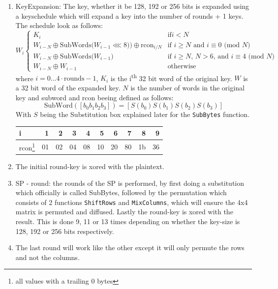 \documentclass[a4paper]{article}
\begin{document}
\begin{enumerate}
\item KeyExpansion: The key, whether it be 128, 192 or 256 bits is expanded using a keyschedule which will expand a key into the number of rounds + 1 keys. The schedule look as follows:
\begin{equation}
W_i \begin{cases}
    K_i & \text{if} i < N\\
    W_{i-N} \oplus \text{SubWords($W_{i-1}\lll 8$))} \oplus \text{rcon}_{i/N} & \text{if $i \geq N$ and $i \equiv 0$ (mod $N$)}\\
    W_{i-N} \oplus \text{SubWords($W_{i-1}$)} & \text{if $i \geq N$, $N > 6$, and $i \equiv 4$ (mod $N$)}\\
    W_{i-N} \oplus W_{i-1} & \text{otherwise}
\end{cases}
\end{equation}
where \(i = 0 ... 4 \cdot \text{rounds} - 1\), \(K_i\) is the i\textsuperscript{th} 32 bit word of the original key. \(W\) is a 32 bit word of the expanded key. \(N\) is the number of words in the original key and subword and rcon beeing defined as follows:
\begin{equation}
 \text{SubWord}([b_0 b_1 b_2 b_3]) = [S(b_0) S(b_1) S(b_2) S(b_3)] \text{}
\end{equation}
With \(S\) being the Substitution box explained later for the \texttt{SubBytes} function.
\begin{center}
\begin{tabular}{lrrrrrrrrr}
i & 1 & 2 & 3 & 4 & 5 & 6 & 7 & 8 & 9\\
\hline
rcon\footnote{all values with a trailing 0 bytes} & 01 & 02 & 04 & 08 & 10 & 20 & 80 & 1b & 36\\
\end{tabular}

\end{center}

\item The initial round-key is xored with the plaintext.
\item SP - round: the rounds of the SP is performed, by first doing a substitution which officially is called SubBytes\cite{Rijndahl}, followed by the permutation which consists of 2 functions \texttt{ShiftRows} and \texttt{MixColumns}, which will ensure the 4x4 matrix is permuted and diffused. Lastly the round-key is xored with the result. This is done 9, 11 or 13 times depending on whether the key-size is 128, 192 or 256 bits respectively.
\item The last round will work like the other except it will only permute the rows and not the columns.
\end{enumerate}
\end{document}
